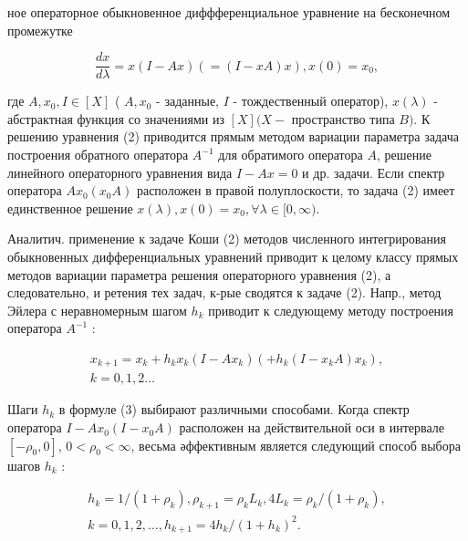 \documentclass[10pt]{article}
\begin{document}
ное операторное обыкновенное диффференциальное уравнение на бесконечном промежутке



\[

\frac{d x}{d \lambda}=x(I-A x)(=(I-x A) x), x(0)=x_{0},

\]



где $A, x_{0}, I \in[X]$ ( $A, x_{0}$ - заданные, $I$ - тождественный оператор), $x(\lambda)$ - абстрактная функция со значениями из $[X](X-$ пространство типа $B)$. $К$ решению уравнения (2) приводится прямым методом вариации параметра задача построения обратного оператора $A^{-1}$ для обратимого оператора $A$, решение линейного операторного уравнения вида $I-A x=0$ и др. задачи. Если спектр оператора $A x_{0}\left(x_{0} A\right)$ расположен в правой полуплоскости, то задача (2) имеет единственное решение $x(\lambda), x(0)=x_{0}, \forall \lambda \in[0, \infty)$.



Аналитич. применение к задаче Коши (2) методов численного интегрирования обыкновенных дифференциальных уравнений приводит к целому классу прямых методов вариации параметра решения операторного уравнения (2), а следовательно, и ретения тех задач, к-рые сводятся к задаче (2). Напр., метод Эйлера с неравномерным шагом $h_{k}$ приводит к следующему методу построения оператора $A^{-1}$ :



\[

\begin{gathered}

x_{k+1}=x_{k}+h_{k} x_{k}\left(I-A x_{k}\right)\left(+h_{k}\left(I-x_{k} A\right) x_{k}\right), \\

k=0,1,2 \ldots

\end{gathered}

\]



Шаги $h_{k}$ в формуле (3) выбирают различными способами. Когда спектр оператора $I-A x_{0}\left(I-x_{0} A\right)$ расположен на действительной оси в интервале $\left[-\rho_{0}, 0\right]$, $0<\rho_{0}<\infty$, весьма әффективным является следующий способ выбора шагов $h_{k}$ :



\[

\begin{gathered}

h_{k}=1 /\left(1+\rho_{k}\right), \rho_{k+1}=\rho_{k} L_{k}, 4 L_{k}=\rho_{k} /\left(1+\rho_{k}\right), \\

k=0,1,2, \ldots, h_{k+1}=4 h_{k} /\left(1+h_{k}\right)^{2} .

\end{gathered}

\]
\end{document}

